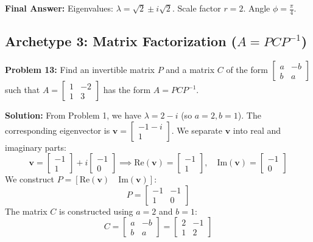 \documentclass[11pt, letterpaper]{article}
\theoremstyle{definition}
\theoremstyle{remark}
\begin{document}
\textbf{Final Answer:} Eigenvalues: $\lambda = \sqrt{2} \pm i\sqrt{2}$. Scale factor $r = 2$. Angle $\phi = \frac{\pi}{4}$.

\subsection{Archetype 3: Matrix Factorization ($A = PCP^{-1}$)}

\textbf{Problem 13:} Find an invertible matrix $P$ and a matrix $C$ of the form $\begin{bmatrix} a & -b \\ b & a \end{bmatrix}$ such that $A = \begin{bmatrix} 1 & -2 \\ 1 & 3 \end{bmatrix}$ has the form $A = PCP^{-1}$.

\textbf{Solution:}
From Problem 1, we have $\lambda = 2 - i$ (so $a = 2, b = 1$).
The corresponding eigenvector is $\mathbf{v} = \begin{bmatrix} -1 - i \\ 1 \end{bmatrix}$.
We separate $\mathbf{v}$ into real and imaginary parts:
\[
\mathbf{v} = \begin{bmatrix} -1 \\ 1 \end{bmatrix} + i \begin{bmatrix} -1 \\ 0 \end{bmatrix} \implies \text{Re}(\mathbf{v}) = \begin{bmatrix} -1 \\ 1 \end{bmatrix}, \quad \text{Im}(\mathbf{v}) = \begin{bmatrix} -1 \\ 0 \end{bmatrix}
\]
We construct $P = [\text{Re}(\mathbf{v}) \quad \text{Im}(\mathbf{v})]$:
\[
P = \begin{bmatrix} -1 & -1 \\ 1 & 0 \end{bmatrix}
\]
The matrix $C$ is constructed using $a = 2$ and $b = 1$:
\[
C = \begin{bmatrix} a & -b \\ b & a \end{bmatrix} = \begin{bmatrix} 2 & -1 \\ 1 & 2 \end{bmatrix}
\]
\end{document}
